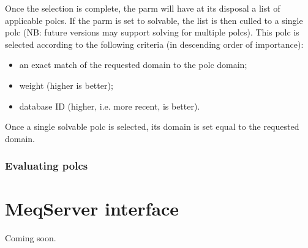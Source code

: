 \documentclass[10pt]{article}
\begin{document}
  Once the selection is complete, the parm will have at its disposal a list of
  applicable polcs. If the parm is set to solvable, the list is then culled to
  a single polc (NB: future versions may support solving for multiple polcs).
  This polc is selected according to the following criteria (in descending
  order of importance):

  \begin{itemize}
  
  \item an exact match of the requested domain to the polc domain;
  
  \item weight (higher is better);
  
  \item database ID (higher, i.e. more recent, is better).
  
  \end{itemize}
  
  Once a single solvable polc is selected, its domain is set equal to the
  requested domain.
  
\subsubsection{Evaluating polcs}

  

\subsubsection{}    
  
  
  

\section{MeqServer interface}

Coming soon.
\end{document}
